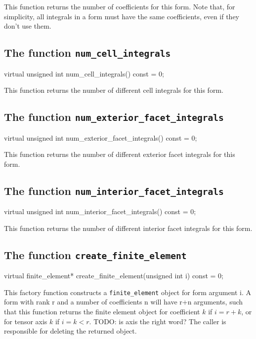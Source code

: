 This function returns the number of coefficients for this form.
Note that, for simplicity, all integrals in a form must have
the same coefficients, even if they don't use them.

\subsection{The function \texttt{num\_cell\_integrals}}

\begin{code}
virtual unsigned int num_cell_integrals() const = 0;
\end{code}

This function returns the number of different cell integrals for this form.

\subsection{The function \texttt{num\_exterior\_facet\_integrals}}

\begin{code}
virtual unsigned int num_exterior_facet_integrals() const = 0;
\end{code}

This function returns the number of different exterior facet integrals for this form.

\subsection{The function \texttt{num\_interior\_facet\_integrals}}

\begin{code}
virtual unsigned int num_interior_facet_integrals() const = 0;
\end{code}

This function returns the number of different interior facet integrals for this form.

\subsection{The function \texttt{create\_finite\_element}}

\begin{code}
virtual finite_element* create_finite_element(unsigned int i) const = 0;
\end{code}

This factory function constructs a \texttt{finite\_element} object for form argument i.
A form with rank r and a number of coefficients n will have r+n arguments,
such that this function returns the finite element object for coefficient $k$ if $i=r+k$,
or for tensor axis $k$ if $i=k<r$. TODO: is axis the right word?
The caller is responsible for deleting the returned object.

